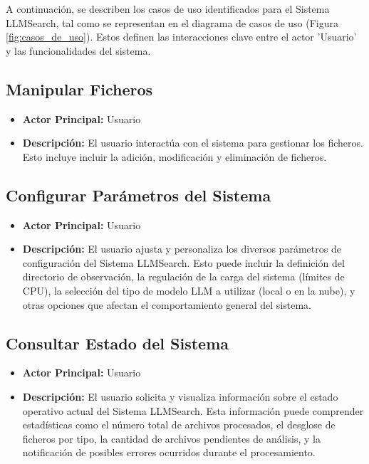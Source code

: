 A continuación, se describen los casos de uso identificados para el Sistema LLMSearch, tal como se representan en el diagrama de casos de uso (Figura \ref{fig:casos_de_uso}). Estos definen las interacciones clave entre el actor 'Usuario' y las funcionalidades del sistema.

\subsection{Manipular Ficheros}
\begin{itemize}
\item \textbf{Actor Principal:} Usuario
\item \textbf{Descripción:} El usuario interactúa con el sistema para gestionar los ficheros. Esto incluye incluir la adición, modificación y eliminación de ficheros.
\end{itemize}

\subsection{Configurar Parámetros del Sistema}
\begin{itemize}
\item \textbf{Actor Principal:} Usuario
\item \textbf{Descripción:} El usuario ajusta y personaliza los diversos parámetros de configuración del Sistema LLMSearch. Esto puede incluir la definición del directorio de observación, la regulación de la carga del sistema (límites de CPU), la selección del tipo de modelo LLM a utilizar (local o en la nube), y otras opciones que afectan el comportamiento general del sistema.
\end{itemize}

\subsection{Consultar Estado del Sistema}
\begin{itemize}
\item \textbf{Actor Principal:} Usuario
\item \textbf{Descripción:} El usuario solicita y visualiza información sobre el estado operativo actual del Sistema LLMSearch. Esta información puede comprender estadísticas como el número total de archivos procesados, el desglose de ficheros por tipo, la cantidad de archivos pendientes de análisis, y la notificación de posibles errores ocurridos durante el procesamiento.
\end{itemize}

